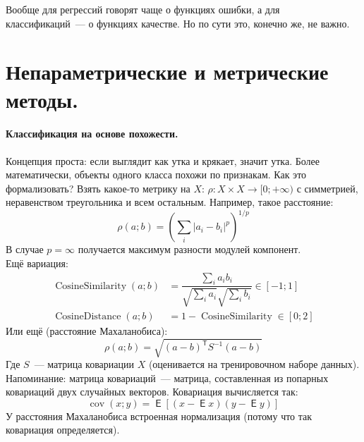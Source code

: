\documentclass{article}
\DeclareMathOperator{\Expected}{\mathsf{E}}
\begin{document}
    Вообще для регрессий говорят чаще о функциях ошибки, а для классификаций~--- о функциях качестве. Но по сути это, конечно же, не важно.
    \section{Непараметрические и метрические методы.}
    \paragraph{Классификация на основе похожести.}
    Концепция проста: если выглядит как утка и крякает, значит утка. Более математически, объекты одного класса похожи по признакам. Как это формализовать? Взять какое-то метрику на $X$: $\rho\colon X\times X\to[0;+\infty)$ с симметрией, неравенством треугольника и всем остальным. Например, такое расстояние:
    \[
    \rho(a;b)=\left(\sum\limits_i|a_i-b_i|^p\right)^{1/p}
    \]
    В случае $p=\infty$ получается максимум разности модулей компонент.\\
    Ещё вариация:
    \[
    \begin{aligned}
        \operatorname{CosineSimilarity}(a;b)&=\dfrac{\sum\limits_ia_ib_i}{\sqrt{\sum\limits_ia_i}\sqrt{\sum\limits_ib_i}}\in[-1;1]\\
        \operatorname{CosineDistance}(a;b)&=1-\operatorname{CosineSimilarity}\in[0;2]
    \end{aligned}
    \]
    Или ещё (расстояние Махаланобиса):
    \[
    \rho(a;b)=\sqrt{(a-b)^{\mathsf T}S^{-1}(a-b)}
    \]
    Где $S$~--- матрица ковариации $X$ (оценивается на тренировочном наборе данных). Напоминание: матрица ковариаций~--- матрица, составленная из попарных ковариаций двух случайных векторов. Ковариация вычисляется так:
    \[
    \operatorname{cov}(x;y)=\Expected[(x-\Expected x)(y-\Expected y)]
    \]
    У расстояния Махаланобиса встроенная нормализация (потому что так ковариация определяется).
\end{document}
